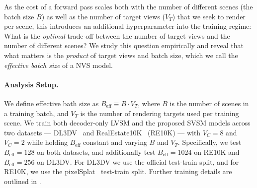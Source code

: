 As the cost of a forward pass scales both with the number of different scenes (the batch size $B$) as well as the number of target views ($V_T$) that we seek to render per scene, this introduces an additional hyperparameter into the training regime: What is the \emph{optimal} trade-off between the number of target views and the number of different scenes? 
We study this question empirically and reveal that what matters is the \emph{product} of target views and batch size, which we call the \emph{effective batch size} of a NVS model. 
\vspace{-1\baselineskip}



\paragraph{Analysis Setup.}
%
We define effective bath size as $B_{\text{eff}} \equiv B \cdot V_T$, where $B$ is the number of scenes in a training batch, and $V_T$ is the number of rendering targets used per training scene.
%
We train both decoder-only LVSM and the proposed SVSM models across two datasets --- DL3DV~\cite{ling2024dl3dv} and RealEstate10K~\cite{zhou2018stereo} (RE10K) --- with $V_C = 8$ and $V_C = 2$ while holding $B_{\text{eff}}$ constant and varying $B$ and $V_T$. Specifically, we test $B_{\text{eff}} = 128$ on both datasets, and additionally test $B_{\text{eff}} = 1024$ on RE10K and $B_{\text{eff}} = 256$ on DL3DV. For DL3DV we use the official test-train split, and for RE10K, we use the pixelSplat~\citep{charatan2024pixelsplat} test-train split.
%
Further training details are outlined in .

